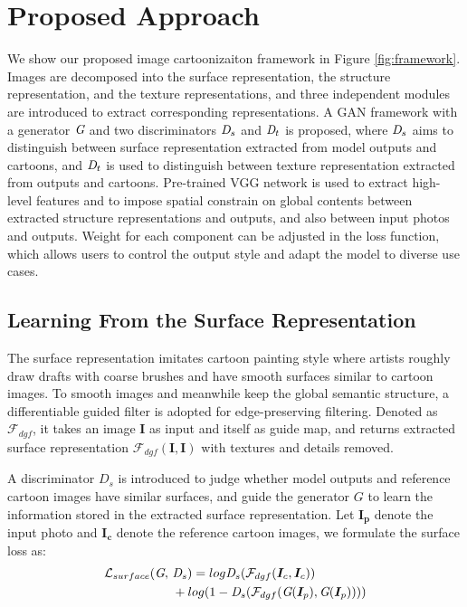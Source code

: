 \documentclass[10pt,twocolumn,letterpaper]{article}
\begin{document}
\section{Proposed Approach}
\vspace{-0.3em}
We show our proposed image cartoonizaiton framework in Figure \ref{fig:framework}. Images are decomposed into the surface representation, the structure representation, and the texture representations, and three independent modules are introduced to extract corresponding representations. A GAN framework with a generator $\textit G$ and two discriminators $\textit D_{s}$ and $\textit D_{t}$ is proposed, where $\textit D_{s}$ aims to distinguish between surface representation extracted from model outputs and cartoons, and $\textit D_{t}$ is used to distinguish between texture representation extracted from outputs and cartoons. Pre-trained VGG network \cite{simonyan2014very} is used to extract high-level features and to impose spatial constrain on global contents between extracted structure representations and outputs, and also between input photos and outputs. Weight for each component can be adjusted in the loss function, which allows users to control the output style and adapt the model to diverse use cases.
\vspace{-0.3em}
\subsection{Learning From the Surface Representation}
\vspace{-0.3em}
The surface representation imitates cartoon painting style where artists roughly draw drafts with coarse brushes and have smooth surfaces similar to cartoon images. To smooth images and meanwhile keep the global semantic structure, a differentiable guided filter is adopted for edge-preserving filtering. Denoted as $\mathcal{F}_{dgf}$,  it takes an image $\bm{I}$ as input and itself as guide map, and returns extracted surface representation $\mathcal{F}_{dgf}(\bm{I}, \bm{I})$ with textures and details removed. 

 A discriminator $D_{s}$ is introduced to judge whether model outputs and reference cartoon images have similar surfaces, and guide the generator $G$ to learn the information stored in the extracted surface representation. Let $\bm{I_p}$ denote the input photo and $\bm{I_c}$ denote the reference cartoon images, we formulate the surface loss as:
\begin{equation}
\vspace{-0.5em}
\begin{aligned}
\mathcal{L}_{surface}(\textit G,~&\textit D_{s}) = log\textit D_{s}({\mathcal{F}_{dgf}}(\bm{I}_c, \bm{I}_c))\\
&+log(1-\textit D_{s}(\mathcal{F}_{dgf}(\textit G(\bm{I}_p), \textit G(\bm{I}_p))))
\end{aligned}
\label{eqn:equation1}
\end{equation}
\end{document}
